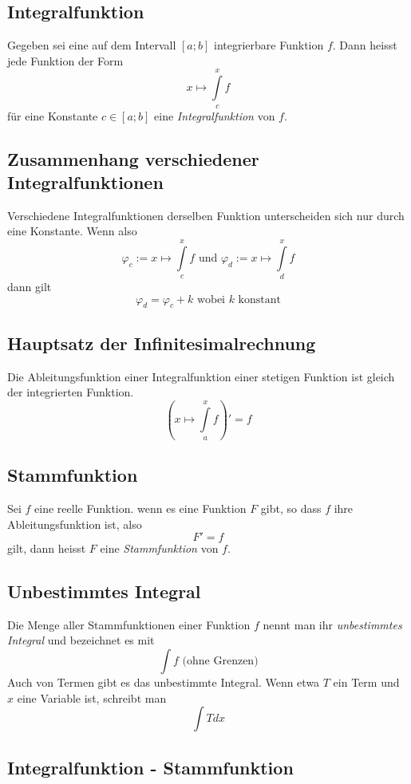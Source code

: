\documentclass[10pt,a4paper]{scrartcl}
\begin{document}
\subsection{Integralfunktion}

Gegeben sei eine auf dem Intervall $[a;b]$ integrierbare Funktion $f$. Dann
heisst jede Funktion der Form
$$x \mapsto \int\limits_c^x f$$
für eine Konstante $c \in [a;b]$ eine \emph{Integralfunktion} von $f$.


\subsection{Zusammenhang verschiedener Integralfunktionen}

Verschiedene Integralfunktionen derselben Funktion unterscheiden sich nur durch
eine Konstante. Wenn also
$$\varphi_c := x \mapsto \int\limits_c^x f \textrm{ und } \varphi_d := x
    \mapsto \int\limits_d^x f$$
dann gilt
$$\varphi_d = \varphi_c + k \textrm{ wobei } k \textrm{ konstant}$$


\subsection{Hauptsatz der Infinitesimalrechnung}

Die Ableitungsfunktion einer Integralfunktion einer stetigen Funktion ist gleich
der integrierten Funktion.
$$\left(x \mapsto \int\limits_a^x f\right)' = f$$


\subsection{Stammfunktion}

Sei $f$ eine reelle Funktion. wenn es eine Funktion $F$ gibt, so dass $f$ ihre
Ableitungsfunktion ist, also
$$F' = f$$
gilt, dann heisst $F$ eine \emph{Stammfunktion} von $f$.


\subsection{Unbestimmtes Integral}

Die Menge aller Stammfunktionen einer Funktion $f$ nennt man ihr
\emph{unbestimmtes Integral} und bezeichnet es mit
$$\int f \textrm{ (ohne Grenzen)}$$
Auch von Termen gibt es das unbestimmte Integral. Wenn etwa $T$ ein Term und
$x$ eine Variable ist, schreibt man
$$\int Tdx$$


\subsection{Integralfunktion - Stammfunktion}
\end{document}
